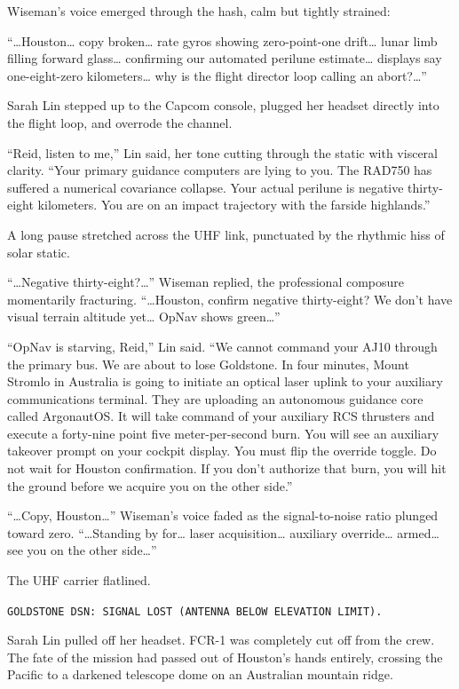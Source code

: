 \documentclass[12pt,twoside,openright]{book}
\begin{document}
Wiseman's voice emerged through the hash, calm but tightly strained:

``\ldots Houston\ldots{} copy broken\ldots{} rate gyros showing
zero-point-one drift\ldots{} lunar limb filling forward glass\ldots{}
confirming our automated perilune estimate\ldots{} displays say
one-eight-zero kilometers\ldots{} why is the flight director loop
calling an abort?\ldots{}''

Sarah Lin stepped up to the Capcom console, plugged her headset directly
into the flight loop, and overrode the channel.

``Reid, listen to me,'' Lin said, her tone cutting through the static
with visceral clarity. ``Your primary guidance computers are lying to
you. The RAD750 has suffered a numerical covariance collapse. Your
actual perilune is negative thirty-eight kilometers. You are on an
impact trajectory with the farside highlands.''

A long pause stretched across the UHF link, punctuated by the rhythmic
hiss of solar static.

``\ldots Negative thirty-eight?\ldots{}'' Wiseman replied, the
professional composure momentarily fracturing. ``\ldots Houston, confirm
negative thirty-eight? We don't have visual terrain altitude yet\ldots{}
OpNav shows green\ldots{}''

``OpNav is starving, Reid,'' Lin said. ``We cannot command your AJ10
through the primary bus. We are about to lose Goldstone. In four
minutes, Mount Stromlo in Australia is going to initiate an optical
laser uplink to your auxiliary communications terminal. They are
uploading an autonomous guidance core called ArgonautOS. It will take
command of your auxiliary RCS thrusters and execute a forty-nine point
five meter-per-second burn. You will see an auxiliary takeover prompt on
your cockpit display. You must flip the override toggle. Do not wait for
Houston confirmation. If you don't authorize that burn, you will hit the
ground before we acquire you on the other side.''

``\ldots Copy, Houston\ldots{}'' Wiseman's voice faded as the
signal-to-noise ratio plunged toward zero. ``\ldots Standing by
for\ldots{} laser acquisition\ldots{} auxiliary override\ldots{}
armed\ldots{} see you on the other side\ldots{}''

The UHF carrier flatlined.

\passthrough{\lstinline!GOLDSTONE DSN: SIGNAL LOST (ANTENNA BELOW ELEVATION LIMIT).!}

Sarah Lin pulled off her headset. FCR-1 was completely cut off from the
crew. The fate of the mission had passed out of Houston's hands
entirely, crossing the Pacific to a darkened telescope dome on an
Australian mountain ridge.
\end{document}
